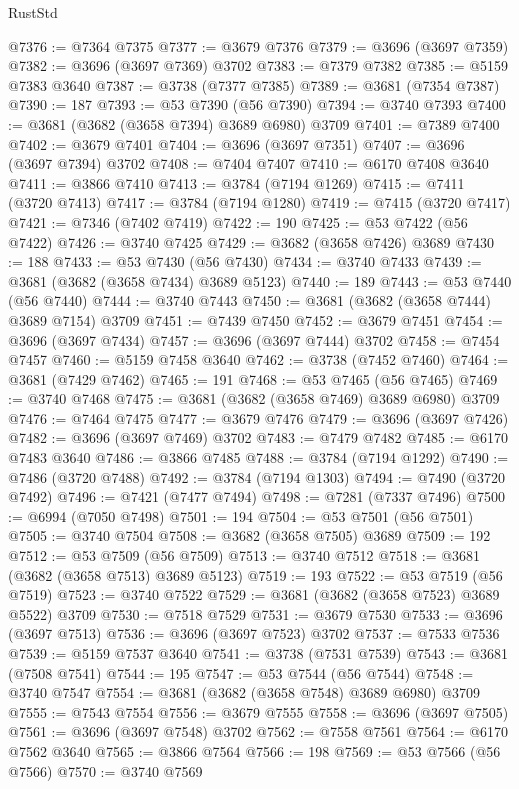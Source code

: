 \begin{lexlean}{RustStd}
\begin{coremodule}
@7376 := @7364 @7375
@7377 := @3679 @7376
@7379 := @3696 (@3697 @7359)
@7382 := @3696 (@3697 @7369) @3702
@7383 := @7379 @7382
@7385 := @5159 @7383 @3640
@7387 := @3738 (@7377 @7385)
@7389 := @3681 (@7354 @7387)
@7390 := 187
@7393 := @53 @7390 (@56 @7390)
@7394 := @3740 @7393
@7400 := @3681 (@3682 (@3658 @7394) @3689 @6980) @3709
@7401 := @7389 @7400
@7402 := @3679 @7401
@7404 := @3696 (@3697 @7351)
@7407 := @3696 (@3697 @7394) @3702
@7408 := @7404 @7407
@7410 := @6170 @7408 @3640
@7411 := @3866 @7410
@7413 := @3784 (@7194 @1269)
@7415 := @7411 (@3720 @7413)
@7417 := @3784 (@7194 @1280)
@7419 := @7415 (@3720 @7417)
@7421 := @7346 (@7402 @7419)
@7422 := 190
@7425 := @53 @7422 (@56 @7422)
@7426 := @3740 @7425
@7429 := @3682 (@3658 @7426) @3689
@7430 := 188
@7433 := @53 @7430 (@56 @7430)
@7434 := @3740 @7433
@7439 := @3681 (@3682 (@3658 @7434) @3689 @5123)
@7440 := 189
@7443 := @53 @7440 (@56 @7440)
@7444 := @3740 @7443
@7450 := @3681 (@3682 (@3658 @7444) @3689 @7154) @3709
@7451 := @7439 @7450
@7452 := @3679 @7451
@7454 := @3696 (@3697 @7434)
@7457 := @3696 (@3697 @7444) @3702
@7458 := @7454 @7457
@7460 := @5159 @7458 @3640
@7462 := @3738 (@7452 @7460)
@7464 := @3681 (@7429 @7462)
@7465 := 191
@7468 := @53 @7465 (@56 @7465)
@7469 := @3740 @7468
@7475 := @3681 (@3682 (@3658 @7469) @3689 @6980) @3709
@7476 := @7464 @7475
@7477 := @3679 @7476
@7479 := @3696 (@3697 @7426)
@7482 := @3696 (@3697 @7469) @3702
@7483 := @7479 @7482
@7485 := @6170 @7483 @3640
@7486 := @3866 @7485
@7488 := @3784 (@7194 @1292)
@7490 := @7486 (@3720 @7488)
@7492 := @3784 (@7194 @1303)
@7494 := @7490 (@3720 @7492)
@7496 := @7421 (@7477 @7494)
@7498 := @7281 (@7337 @7496)
@7500 := @6994 (@7050 @7498)
@7501 := 194
@7504 := @53 @7501 (@56 @7501)
@7505 := @3740 @7504
@7508 := @3682 (@3658 @7505) @3689
@7509 := 192
@7512 := @53 @7509 (@56 @7509)
@7513 := @3740 @7512
@7518 := @3681 (@3682 (@3658 @7513) @3689 @5123)
@7519 := 193
@7522 := @53 @7519 (@56 @7519)
@7523 := @3740 @7522
@7529 := @3681 (@3682 (@3658 @7523) @3689 @5522) @3709
@7530 := @7518 @7529
@7531 := @3679 @7530
@7533 := @3696 (@3697 @7513)
@7536 := @3696 (@3697 @7523) @3702
@7537 := @7533 @7536
@7539 := @5159 @7537 @3640
@7541 := @3738 (@7531 @7539)
@7543 := @3681 (@7508 @7541)
@7544 := 195
@7547 := @53 @7544 (@56 @7544)
@7548 := @3740 @7547
@7554 := @3681 (@3682 (@3658 @7548) @3689 @6980) @3709
@7555 := @7543 @7554
@7556 := @3679 @7555
@7558 := @3696 (@3697 @7505)
@7561 := @3696 (@3697 @7548) @3702
@7562 := @7558 @7561
@7564 := @6170 @7562 @3640
@7565 := @3866 @7564
@7566 := 198
@7569 := @53 @7566 (@56 @7566)
@7570 := @3740 @7569

\end{coremodule}
\end{lexlean}
